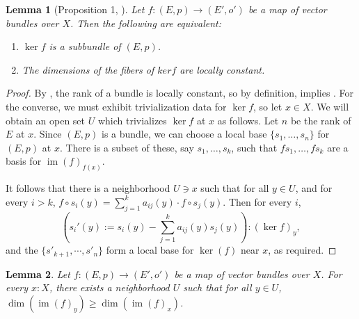 \documentclass[11pt]{article}
\newcommand{\im}{\operatorname{im}}
\renewcommand{\ker}{\operatorname{ker}}
\theoremstyle{plain}
\newtheorem{lemma}{Lemma}[section]
\theoremstyle{definition}
\begin{document}
\begin{lemma}[Proposition 1, \cite{swan1962vector}]\label{lemma:proposition-1}
  Let \(f : (E,p) \to (E',o')\) be a map of vector bundles over \(X\). Then the following are equivalent:
  \begin{enumerate}[label={(\alph*)}]
  \item \label{lemma:proposition-1-1} \(\ker f\) is a subbundle of \((E,p)\). 
  \item \label{lemma:proposition-1-2} The dimensions of the fibers of \(ker f\) are locally constant.
  \end{enumerate}
\end{lemma}
\begin{proof}
  By , the rank of a bundle is locally constant, so by definition,  implies . For the converse, we must exhibit trivialization data for \(\ker f\), so let \(x \in X\). We will obtain an open set \(U\) which trivializes \(\ker f\) at \(x\) as follows. Let \(n\) be the rank of \(E\) at \(x\). Since \((E,p)\) is a bundle, we can choose a local base \(\{s_1, \dots, s_n\}\) for \((E,p)\) at \(x\). There is a subset of these, say \(s_1, \dots, s_k\), such that \(f s_1, \dots, f s_k\) are a basis for \(\im(f)_{f(x)}\).
  
  
  It follows that there is a neighborhood \(U \ni x\) such that for all \(y \in U\), and for every \(i > k\), \(f \circ s_i(y) = \sum_{j = 1}^k a_{ij}(y) \cdot f \circ s_j(y).\) Then for every \(i\),
  \[\left( s_i'(y) := s_i(y) - \sum_{j = 1}^k a_{ij}(y)s_j(y) \right) : (\ker f)_y,\]
  and the $\{s'_{k+1}, \cdots, s'_{n}\}$ form a local base for \(\ker(f)\) near \(x\), as required.
\end{proof}

\begin{lemma}\label{lemma:proposition-1-aux}
  Let \(f : (E,p) \to (E', o')\) be a map of vector bundles over \(X\). For every \(x : X\), there exists a neighborhood \(U\) such that for all \(y \in U\), \(\dim(\im(f)_y) \geq \dim(\im(f)_x)\).
\end{lemma}
\end{document}
